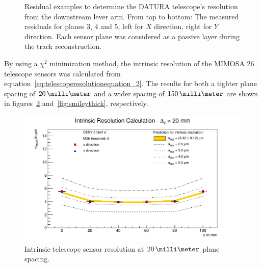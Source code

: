 \begin{figure}[hbtp]
\centering

\caption[Residual examples to determine the DATURA telescope's
resolution. Downstream lever arm]{Residual examples to determine the DATURA
telescope's resolution from the downstream lever arm. From top to bottom: The
measured residuals for planes $3$, $4$ and $5$, left for $X$ direction, right
for $Y$ direction. Each sensor plane was considered as a passive layer during
the track reconstruction.}
\label{fig:residualexample2}
\end{figure}

By using a $\chi^{2}$ minimization method, the intrinsic resolution of the
{MIMOSA 26} telescope sensors was calculated from
equation~\ref{eq:telescoperesolutionequation_2}. The results for both a tighter
plane spacing of $20\,\milli\meter$ and a wider spacing of $150\,\milli\meter$
are shown in figures~\ref{fig:smileythin} and~\ref{fig:smileythick},
respectively.\\

\begin{figure}[hbtp]
\centering
\includegraphics[width=\textwidth]{figures/thin_smiley.pdf}
\caption[Intrinsic telescope sensor resolution at $20\,\milli\meter$ plane
spacing]{Intrinsic telescope sensor resolution at $20\,\milli\meter$ plane
spacing.}
\label{fig:smileythin}
\end{figure}



